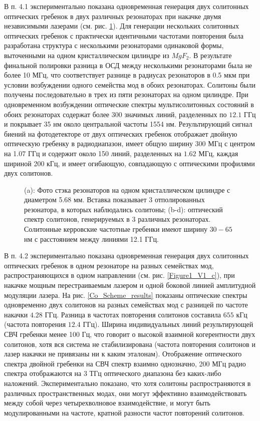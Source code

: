 В п. 4.1 экспериментально показана одновременная генерация двух солитонных оптических гребенок в двух различных резонаторах при накачке двумя независимыми лазерами (см. рис. \ref{ris:image1}). Для генерации нескольких солитонных оптических гребенок с практически идентичными частотами повторения была разработана структура с несколькими резонаторами одинаковой формы, выточенными на одном кристаллическом цилиндре из $MgF_2$. В результате финальной полировки разница в ОСД между несколькими резонаторами была не более 10 МГц, что соответствует разнице в радиусах резонаторов в 0.5 мкм при условии возбуждении одного семейства мод в обоих резонаторах. Солитоны были получены последовательно в трех из пяти резонаторах на одном цилиндре. При одновременном возбуждении оптические спектры мультисолитонных состояний в обоих резонаторах содержат более 300 значимых линий, разделенных по $12.1$ ГГц и покрывает 35 нм около центральной частоты 1554 нм. Результирующий сигнал биений на фотодетекторе от двух оптических гребенок отображает двойную оптическую гребенку в радиодиапазон, имеет общую ширину 300 МГц с центром на 1.07 ГГц и содержит около 150 линий, разделенных на $1.62$ МГц, каждая шириной 200 кГц, и имеет огибающую, совпадающую с оптическими профилями двух солитонов.

\begin{figure}[ht]
\begin{minipage}[ht]{1\linewidth}
\end{minipage}
\caption{(a): Фото стэка резонаторов на одном кристаллическом цилиндре с диаметром 5.68 мм. Вставка показывает 3 отполированных резонатора, в которых наблюдались солитоны; (b-d): оптический спектр солитонов, генерируемых в 3 различных резонаторах. Солитонные керровские частотные гребенки имеют ширину $30 - 65$ нм с расстоянием между линиями 12.1 ГГц.}
\label{ris:image1}
\end{figure}

В п. 4.2 экспериментально показана одновременная генерация двух солитонных оптических гребенок в одном резонаторе на разных семействах мод, распространяющихся в одном направлении (см. рис. \ref{Figure1_V1_c}), при накачке мощным перестраиваемым лазером и одной боковой линией амплитудной модуляции лазера. На рис. \ref{Co_Scheme_results} показаны оптические спектры одновременно двух солитонов на разных семействах мод с разницей по частоте накачки $4.28$ ГГц. Разница в частотах повторения солитонов составила $655$ кГц (частота повторения $12.4$ ГГц). Ширина индивидуальных линий результирующей СВЧ гребенки менее 100 Гц, что говорит о высокой взаимной когерентности двух солитонов, хотя вся система не стабилизирована (частота повторения солитонов и лазер накачки не привязаны ни к каким эталонам). Отображение оптического спектра двойной гребенки на СВЧ спектр взаимно однозначно, 200 МГц радио спектра отображаются на 3 ТГц оптического диапазона без каких-либо наложений. Экспериментально показано, что хотя солитоны распространяются в различных пространственных модах, они могут эффективно взаимодействовать между собой через четырехволновое взаимодействие, и могут быть модулированными на частоте, кратной разности частот повторений солитонов.

